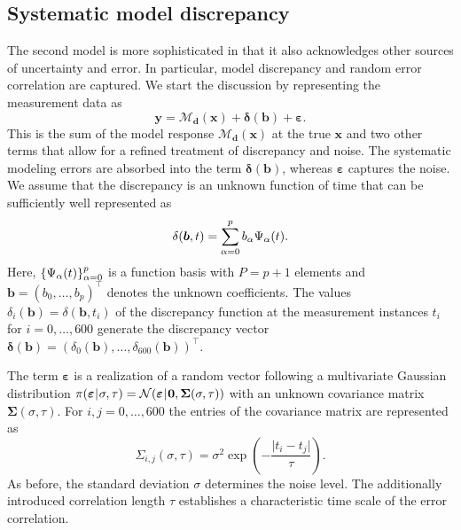 \subsection{Systematic model discrepancy}
The second model is more sophisticated in that it also acknowledges other sources of uncertainty and error.
In particular, model discrepancy and random error correlation are captured.
We start the discussion by representing the measurement data as
\begin{equation} \label{eq:Hydro:Discrepancy:NoisyData}
  \bm{y} = \mathcal{M}_{\bm{d}}(\bm{x}) + \bm{\delta}(\bm{b}) + \bm{\varepsilon}.
\end{equation}
This is the sum of the model response \(\mathcal{M}_{\bm{d}}(\bm{x})\) at the true \(\bm{x}\) and two other terms that allow for a refined treatment of discrepancy and noise.
The systematic modeling errors are absorbed into the term \(\bm{\delta}(\bm{b})\), whereas \(\bm{\varepsilon}\) captures the noise.
We assume that the discrepancy is an unknown function of time that can be sufficiently well represented as
\begin{equation} \label{eq:Hydro:Discrepancy:PolynomialDiscrepancy}
  \delta(\bm{b},t) = \sum\limits_{\alpha=0}^p b_\alpha \Psi_\alpha(t).
\end{equation}
Here, \(\{\Psi_\alpha(t)\}_{\alpha=0}^p\) is a function basis with \(P = p + 1\) elements and \(\bm{b} = (b_0,\ldots,b_p)^\top\) denotes the unknown coefficients.
The values \(\delta_i(\bm{b}) = \delta(\bm{b},t_i)\) of the discrepancy function at the measurement instances \(t_i\) for \(i=0,\ldots,600\)
generate the discrepancy vector \(\bm{\delta}(\bm{b}) = (\delta_0(\bm{b}),\ldots,\delta_{600}(\bm{b}))^\top\).
\par %
The term \(\bm{\varepsilon}\) is a realization of a random vector following a multivariate Gaussian distribution
\(\pi(\bm{\varepsilon} {\:\!}|{\:\!} \sigma,\tau) = \mathcal{N}(\bm{\varepsilon} {\:\!}|{\:\!} \bm{0},\bm{\Sigma}(\sigma,\tau))\)
with an unknown covariance matrix \(\bm{\Sigma}(\sigma,\tau)\).
For \(i,j=0,\ldots,600\) the entries of the covariance matrix are represented as
\begin{equation} \label{eq:Hydro:Discrepancy:CovarianceMatrix}
  \Sigma_{i,j}(\sigma,\tau) = \sigma^2 \exp \left( - \frac{\lvert t_i - t_j \rvert}{\tau} \right).
\end{equation}
As before, the standard deviation \(\sigma\) determines the noise level.
The additionally introduced correlation length \(\tau\) establishes a characteristic time scale of the error correlation.
